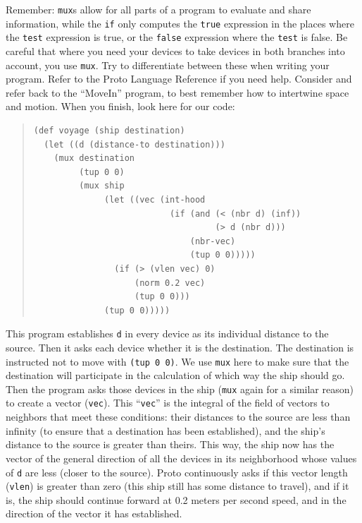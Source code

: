 \documentclass{article}
\newcommand\var[1]{{\tt #1}}
\newcommand\qvar[1]{``{\tt #1}''}
\begin{document}
Remember: \var{mux}s allow for all parts of a program to evaluate and
share information, while the \var{if} only computes the \var{true}
expression in the places where the \var{test} expression is true, or
the \var{false} expression where the \var{test} is false.  Be careful
that where you need your devices to take devices in both branches into
account, you use \var{mux}.  Try to differentiate between these when
writing your program.  Refer to the Proto Language Reference if you
need help.  Consider and refer back to the ``MoveIn'' program, to best
remember how to intertwine space and motion.  When you finish, look
here for our code:

\begin{quote}
\begin{verbatim}
(def voyage (ship destination)
  (let ((d (distance-to destination)))
    (mux destination
         (tup 0 0)
         (mux ship
              (let ((vec (int-hood
                           (if (and (< (nbr d) (inf))
                                    (> d (nbr d)))
                               (nbr-vec)
                               (tup 0 0)))))
                (if (> (vlen vec) 0)
                    (norm 0.2 vec)
                    (tup 0 0)))
              (tup 0 0)))))
\end{verbatim}
\end{quote}

This program establishes \var{d} in every device as its individual
distance to the source.  Then it asks each device whether it is the
destination.  The destination is instructed not to move with 
\var{(tup 0 0)}.  We use \var{mux} here to make sure that the
destination will participate in the calculation of which way the ship
should go.  Then the program asks those devices in the ship
(\var{mux} again for a similar reason) to create a vector (\var{vec}).
This \qvar{vec} is the integral of the field of vectors to neighbors
that meet these conditions: their distances to the source are less
than infinity (to ensure that a destination has been established), and
the ship's distance to the source is greater than theirs.  This way,
the ship now has the vector of the general direction of all the
devices in its neighborhood whose values of \var{d} are less (closer
to the source).  Proto continuously asks if this vector length
(\var{vlen}) is greater than zero (this ship still has some distance
to travel), and if it is, the ship should continue forward at 0.2
meters per second speed, and in the direction of the vector it has
established.
\end{document}
